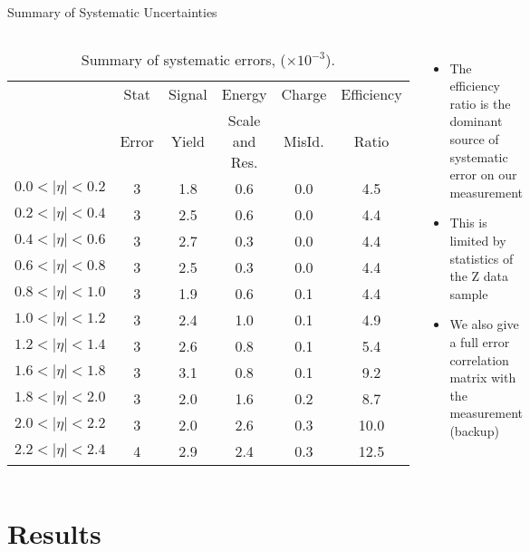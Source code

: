 \documentclass[t, 8pt]{beamer}
\begin{document}
\begin{frame}{Summary of Systematic Uncertainties}
  \begin{columns}[c]
  \tiny{
  \begin{center}
    \begin{table}
    \begin{tabular}{l|c|cccc}
      \hline\hline
      &Stat  &Signal & Energy & Charge &  Efficiency \\
     & Error &Yield & Scale and Res. & MisId. & Ratio \\ \hline
      $0.0<|\eta|<0.2$& 3& 1.8 & 0.6 & 0.0 &  4.5 \\
      $0.2<|\eta|<0.4$& 3& 2.5 & 0.6 & 0.0 &  4.4 \\
      $0.4<|\eta|<0.6$& 3& 2.7 & 0.3 & 0.0 &  4.4 \\
      $0.6<|\eta|<0.8$& 3& 2.5 & 0.3 & 0.0 &  4.4 \\
      $0.8<|\eta|<1.0$& 3& 1.9 & 0.6 & 0.1 &  4.4 \\
      $1.0<|\eta|<1.2$& 3& 2.4 & 1.0 & 0.1 &  4.9 \\
      $1.2<|\eta|<1.4$& 3& 2.6 & 0.8 & 0.1 &  5.4 \\
      $1.6<|\eta|<1.8$& 3& 3.1 & 0.8 & 0.1 &  9.2 \\
      $1.8<|\eta|<2.0$& 3& 2.0 & 1.6 & 0.2 &  8.7 \\
      $2.0<|\eta|<2.2$& 3& 2.0 & 2.6 & 0.3 & 10.0 \\
      $2.2<|\eta|<2.4$& 4& 2.9 & 2.4 & 0.3 & 12.5 \\
    \end{tabular}
    \caption{Summary of systematic errors, ($\times 10^{-3}$).  }
    \end{table}
  \end{center} 
  }

    \begin{itemize}
      \item The efficiency ratio is the dominant source of systematic error on
      our measurement
      \item This is limited by statistics of the Z data sample
      \item We also give a full error correlation matrix with the measurement
      (backup)
    \end{itemize}
  \end{columns}
\end{frame}

\section{Results}
\end{document}
